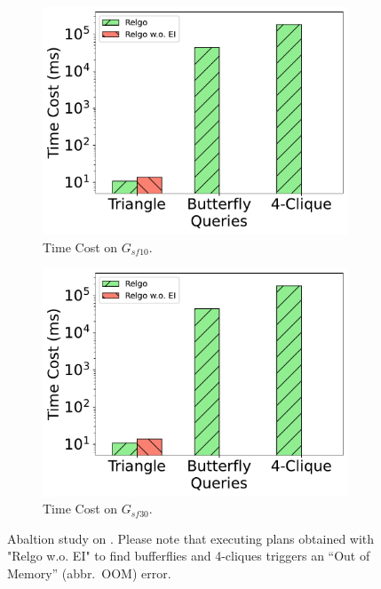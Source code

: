 \begin{figure}[ht]
    \centering
    \begin{subfigure}[b]{.45\linewidth}
        \centering
        \includegraphics[width=\linewidth]{./figures/exp/ablation_ei_sf10.pdf}
        \caption{Time Cost on $G_{sf10}$.}
        \label{fig:exp-ablation-ei-sf10}
    \end{subfigure}
    \begin{subfigure}[b]{0.45\linewidth}
        \centering
        \includegraphics[width=\linewidth]{./figures/exp/ablation_ei_sf10.pdf}
        \caption{Time Cost on $G_{sf30}$.}
        \label{fig:exp-ablation-ei-sf30}
    \end{subfigure}
    \caption{Abaltion study on \expandintersectrule. Please note that executing plans obtained with "Relgo w.o. EI" to find bufferflies and 4-cliques triggers an ``Out of Memory'' (abbr.~OOM) error.}
    \label{fig:exp-ablation-ei}
\end{figure}

